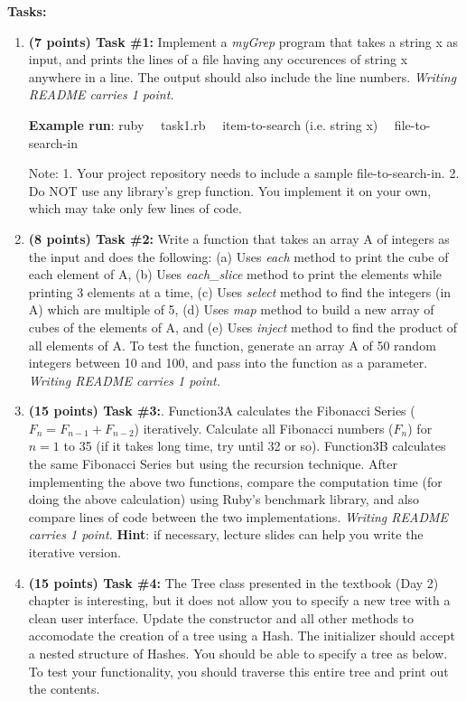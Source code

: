 \documentclass[paper=letter, fontsize=11pt]{scrartcl} %
\begin{document}
    \textbf{Tasks:}
    \begin{enumerate}[noitemsep]
        \item \textbf{(7 points) Task \#1:} 
Implement a \emph{myGrep} program that takes a string x as input, 
and prints the lines of a file having any 
occurences of string x anywhere in a line. 
The output should also include the line numbers.
\emph{Writing README carries 1 point.}

\textbf{Example run}: ruby $~~~$  task1.rb $~~~$  item-to-search (i.e. string x)  $~~~$ file-to-search-in 

Note: 1. Your project repository needs to include a sample file-to-search-in. 2. Do NOT use any library's grep function. You implement it on your own, which may take only few lines of code.
      
  \item \textbf{(8 points) Task \#2:} Write a function that takes an array A of integers as the input and does the following: 
(a) Uses \emph{each} method to print the cube of each element of A, (b) Uses \emph{each\_slice} method to print the elements while printing 
3 elements at a time, (c) Uses \emph{select} method to find the integers (in A) which are multiple of 5, (d) Uses \emph{map} method to build a 
new array of cubes of the elements of A, and (e) Uses \emph{inject} method to find the product of all elements of A.
To test the function, generate an array A of 50 random integers between 10 and 100, and pass into the function as a parameter.
\emph{Writing README carries 1 point.}
        \item \textbf{(15 points) Task \#3:}. Function3A calculates the Fibonacci Series ($F_n = F_{n-1} + F_{n-2}$) iteratively. 
Calculate all Fibonacci numbers ($F_n$) for $n=1$ to 35 (if it takes long time, try until 32 or so). 
Function3B calculates the same Fibonacci Series but using the recursion technique. 
After implementing the above two functions, compare the computation time (for doing the above calculation) 
using Ruby's benchmark library, and also compare lines of code between the two implementations. 
\emph{Writing README carries 1 point.}
\textbf{Hint}: if necessary, lecture slides can help you write the iterative version.
        \item \textbf{(15 points) Task \#4:} The Tree class presented in the textbook (Day 2) chapter is interesting, but it does not allow 
you to specify a new tree with a clean user interface. Update the constructor and all other methods to accomodate the creation of a tree using a Hash. 
The initializer should accept a nested structure of Hashes. You should be able to specify a tree as below. To test your functionality, you should traverse 
this entire tree and print out the contents.


\end{enumerate}
\end{document}
